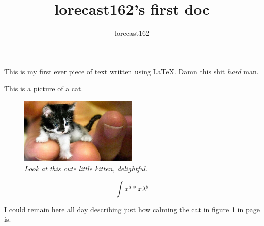 \documentclass[8pt, a4paper]{article}
\title{lorecast162's first doc}
\author{lorecast162}
\begin{document}
\maketitle
This is my first ever piece of text written using LaTeX.
Damn this shit \textit{hard} man.

This is a picture of a cat.
\begin{figure}[h]
  \centering
  \includegraphics[width=0.5\textwidth]{cat}
  \caption{\emph{Look at this cute little kitten, delightful.}}
  \label{fig:catto}
\end{figure}

\[
\int x^5 * x\lambda^y
\]


I could remain here all day describing just
how calming the cat in figure \ref{fig:catto}
in page \pageref{fig:catto} is.
\end{document}

